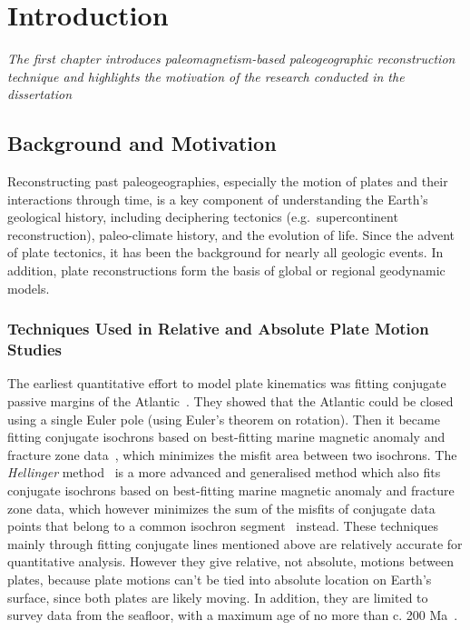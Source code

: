 \chapter{Introduction}\label{chap:Intro}
\textit{The first chapter introduces paleomagnetism-based paleogeographic
reconstruction technique and highlights the motivation of the research conducted
in the dissertation}
\vfill
\minitoc\newpage

\section{Background and Motivation}

Reconstructing past paleogeographies, especially the motion of plates and their
interactions through time, is a key component of understanding the Earth's
geological history, including deciphering tectonics (e.g.\ supercontinent
reconstruction), paleo-climate history, and the evolution of life. Since the
advent of plate tectonics, it has been the background for nearly all geologic
events. In addition, plate reconstructions form the basis of global or regional
geodynamic models.

\subsection{Techniques Used in Relative and Absolute Plate Motion Studies}

The earliest quantitative effort to model plate kinematics was fitting conjugate
passive margins of the Atlantic~\citep{B65,W07}. They showed that the Atlantic
could be closed using a single Euler pole (using Euler's theorem on rotation).
Then it became fitting conjugate isochrons based on best-fitting marine magnetic
anomaly and fracture zone data~\citep{M71}, which minimizes the misfit area
between two isochrons. The \emph{Hellinger} method~\citep{H81} is a more advanced
and generalised method which also fits conjugate isochrons based on best-fitting
marine magnetic anomaly and fracture zone data, which however minimizes the sum
of the misfits of conjugate data points that belong to a common isochron
segment~\citep{W07} instead. These techniques mainly through fitting conjugate
lines mentioned above are relatively accurate for quantitative analysis. However
they give relative, not absolute, motions between plates, because plate motions
can't be tied into absolute location on Earth's surface, since both plates are
likely moving. In addition, they are limited to survey data from the seafloor,
with a maximum age of no more than c. 200 Ma~\citep{M08}.

